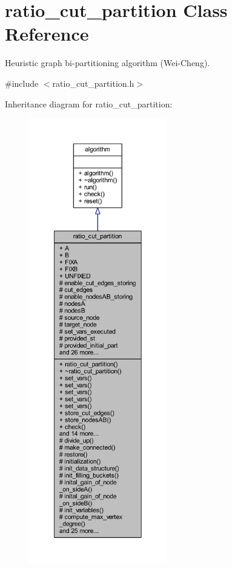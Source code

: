 \hypertarget{classratio__cut__partition}{}\section{ratio\+\_\+cut\+\_\+partition Class Reference}
\label{classratio__cut__partition}


Heuristic graph bi-\/partitioning algorithm (Wei-\/\+Cheng).  




{\ttfamily \#include $<$ratio\+\_\+cut\+\_\+partition.\+h$>$}



Inheritance diagram for ratio\+\_\+cut\+\_\+partition\+:\nopagebreak
\begin{figure}[H]
\begin{center}
\leavevmode
\includegraphics[height=550pt]{classratio__cut__partition__inherit__graph}
\end{center}
\end{figure}


